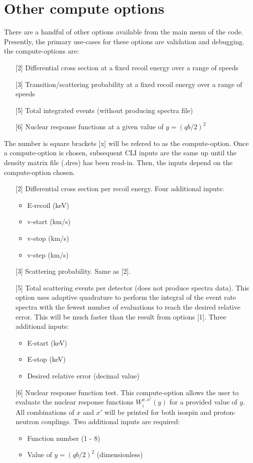 \documentclass[
14pt, %
a4paper, %
oneside, %
headinclude,footinclude, %
BCOR5mm, %
]{scrartcl}
\begin{document}
\section{Other compute options}
There are a handful of other options available from the main menu of the code.  Presently, the primary use-cases for these options are validation and debugging.  the compute-options are:
\begin{itemize}
	\item [{[2]}] Differential cross section at a fixed recoil energy over a range of speeds
	\item [{[3]}] Transition/scattering probability at a fixed recoil energy over a range of speeds
	\item [{[5]}] Total integrated events (without producing spectra file)
	\item [{[6]}] Nuclear response functions at a given value of $y=(qb/2)^2$
\end{itemize}
The number is square brackets [x] will be refered to as the compute-option.
Once a compute-option is chosen,  subsequent CLI inputs are the same up until the density matrix file (.dres) has been read-in. Then, the inputs depend on the compute-option chosen.
\begin{itemize}
	\item [{[2]}] Differential cross section per recoil energy. Four additional inputs:
		\begin{itemize}
			\item E-recoil (keV)
			\item v-start (km/s)
			\item v-stop (km/s)
			\item v-step (km/s)
		\end{itemize}
	\item [{[3]}] Scattering probability. Same as [2].
	\item [{[5]}] Total scattering events per detector (does not produce spectra data).  This option uses adaptive quadrature to perform the integral of the event rate spectra with the fewest number of evaluations to reach the desired relative error.  This will be much faster than the result from options [1]. Three additional inputs:
		\begin{itemize}
			\item E-start (keV)
			\item E-stop (keV)
			\item Desired relative error (decimal value)
		\end{itemize}
	\item [{[6]}] Nuclear response function test. This compute-option allows the user to evaluate the nuclear response functions $W_i^{x,x'}(y)$ for a provided value of $y$. All combinations of $x$ and $x'$ will be printed for both isospin and proton-neutron couplings.  Two additional inputs are required:
	\begin{itemize}
		\item Function number (1 - 8)
		\item Value of $y=(qb/2)^2$ (dimensionless)
	\end{itemize}
\end{itemize}
\end{document}
